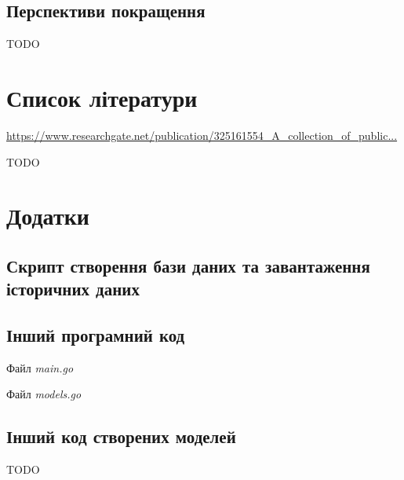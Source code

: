 \documentclass[oneside,14pt]{extarticle}
\begin{document}
\subsection{Перспективи покращення}
TODO

\newpage

\section{Список літератури}
\href{https://www.researchgate.net/publication/325161554_A_collection_of_public_transport_network_data_sets_for_25_cities}{https://www.researchgate.net/publication/325161554\_A\_collection\_of\_public...}

TODO

\newpage

\section{Додатки}
\subsection{Скрипт створення бази даних та завантаження історичних даних}
{\fontsize{8pt}{8pt}\selectfont}

\subsection{Інший програмний код}
Файл \textit{main.go}
{\fontsize{8pt}{8pt}\selectfont}

Файл \textit{models.go}
{\fontsize{8pt}{8pt}\selectfont}

\subsection{Інший код створених моделей}
TODO
\end{document}
